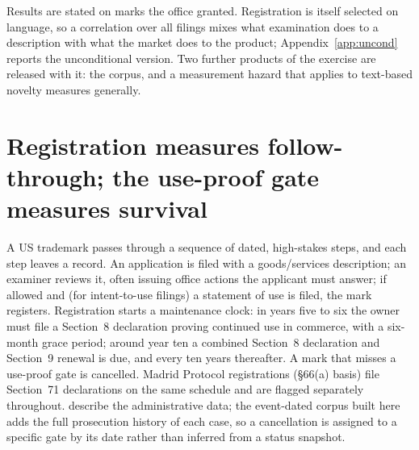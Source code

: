 \documentclass[11pt]{article}
\begin{document}
Results are stated on marks the office granted. Registration is itself
selected on language, so a correlation over all filings mixes what
examination does to a description with what the market does to the product;
Appendix~\ref{app:uncond} reports the unconditional version. Two further
products of the exercise are released with it: the corpus, and a
measurement hazard that applies to text-based novelty measures generally.

\section{Registration measures follow-through; the use-proof gate measures survival}\label{sec:life}

A US trademark passes through a sequence of dated, high-stakes steps, and
each step leaves a record. An application is filed with a goods/services
description; an examiner reviews it, often issuing office actions the
applicant must answer; if allowed and (for intent-to-use filings) a
statement of use is filed, the mark registers. Registration starts a
maintenance clock: in years five to six the owner must file a Section~8
declaration proving continued use in commerce, with a six-month grace
period; around year ten a combined Section~8 declaration and Section~9
renewal is due, and every ten years thereafter. A mark that misses a
use-proof gate is cancelled. Madrid Protocol registrations
(\S66(a) basis) file Section~71 declarations on the same schedule and
are flagged separately throughout. \citet{Graham2013} describe the
administrative data; the event-dated corpus built here adds the full
prosecution history of each case, so a cancellation is assigned to a
specific gate by its date rather than inferred from a status snapshot.
\end{document}
